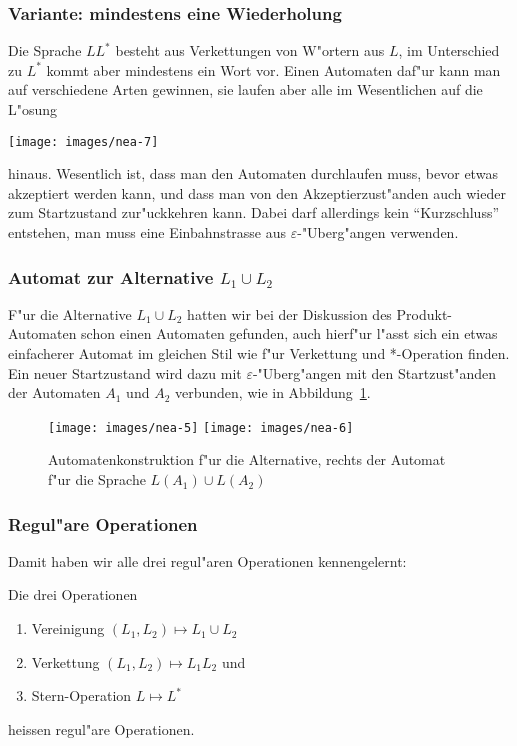 \subsubsection{Variante: mindestens eine Wiederholung}
Die Sprache $LL^*$ besteht aus Verkettungen von W"ortern aus $L$,
im Unterschied zu $L^*$ kommt aber mindestens ein Wort vor.
Einen Automaten daf"ur kann man auf verschiedene Arten gewinnen,
sie laufen aber alle im Wesentlichen auf die L"osung
\begin{center}
\texttt{[image: images/nea-7]}
\end{center}
hinaus. Wesentlich ist, dass man den Automaten durchlaufen muss, bevor
etwas akzeptiert werden kann, und dass man von den Akzeptierzust"anden
auch wieder zum Startzustand zur"uckkehren kann. Dabei darf allerdings
kein ``Kurzschluss'' entstehen, man muss eine Einbahnstrasse aus
$\varepsilon$-"Uberg"angen verwenden.

\subsubsection{Automat zur Alternative $L_1\cup L_2$}
F"ur die Alternative $L_1\cup L_2$ hatten wir bei der Diskussion
des Produkt-Automaten schon einen Automaten gefunden, auch
hierf"ur l"asst sich ein etwas einfacherer Automat im gleichen
Stil wie f"ur Verkettung und *-Operation finden. Ein neuer Startzustand
wird dazu mit $\varepsilon$-"Uberg"angen mit den Startzust"anden
der Automaten $A_1$ und $A_2$ verbunden, wie in Abbildung~\ref{neaalternative}.
\begin{figure}[H]
\begin{center}
\texttt{[image: images/nea-5]}
\qquad
\qquad
\texttt{[image: images/nea-6]}
\end{center}
\caption{Automatenkonstruktion f"ur die Alternative, rechts der Automat
f"ur die Sprache $L(A_1)\cup L(A_2)$\label{neaalternative}}
\end{figure}

\subsubsection{Regul"are Operationen}
Damit haben wir alle drei regul"aren Operationen kennengelernt:

\begin{definition}
Die drei Operationen
\begin{enumerate}
\item Vereinigung $(L_1,L_2)\mapsto L_1\cup L_2$
\item Verkettung $(L_1,L_2)\mapsto L_1L_2$ und
\item Stern-Operation $L\mapsto L^*$
\end{enumerate}
heissen regul"are Operationen.
\end{definition}

